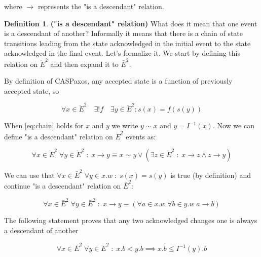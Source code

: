 \documentclass[a4paper,USenglish]{lipics-v2018}
\theoremstyle{definition}
\newtheorem*{mydefinition}{Definition}
\begin{document}
where $\to$ represents the "is a descendant" relation.

\theoremstyle{definition}
\begin{mydefinition}{\bf("is a descendant" relation)}
    What does it mean that one event is a descendant of another? Informally it means that there is a chain of state transitions leading from the state acknowledged in the initial event to the state acknowledged in the final event. Let's formalize it. We start by defining this relation on $\ddot{E}^2$ and then expand it to $\bar{E}^2$.

    By definition of CASPaxos, any accepted state is a function of previously accepted state, so

    \begin{equation} \label{eq:chain}
        \forall x \in \ddot{E}^2 \quad \exists ! f \quad \exists y \in \ddot{E}^2 : s(x) = f(s(y))
    \end{equation}

    When \ref{eq:chain} holds for $x$ and $y$ we write $y \sim x$ and $y = I^{-1}(x)$. Now we can define "is a descendant" relation on $\ddot{E}^2$ events as:

    \begin{equation}
        \forall x \in \ddot{E}^2 \; \forall y \in \ddot{E}^2 \;:\; x \to y \equiv x \sim y \lor (\exists z \in \ddot{E}^2 \;:\; x \to z \land z \to y)
    \end{equation}
  
    We can use that $\forall x \in \bar{E}^2 \; \forall y \in x.w \;:\; s(x) = s(y)$ is true (by definition) and continue "is a descendant" relation on $\bar{E}^2$:
  
    \begin{equation}
        \forall x \in \bar{E}^2 \; \forall y \in \bar{E}^2 \;:\; x \to y \equiv (\forall a \in x.w \; \forall b \in y.w \; a \to b)
    \end{equation}
\end{mydefinition}

\begin{lemma}
    The following statement proves that any two acknowledged changes one is always a descendant of another
  
    \begin{equation} \label{eq:step}
        \forall x \in \bar{E}^2 \; \forall y \in \ddot{E}^2 \;:\; x.b < y.b \implies x.b \leq I^{-1}(y).b
    \end{equation}
\end{lemma}
\end{document}
